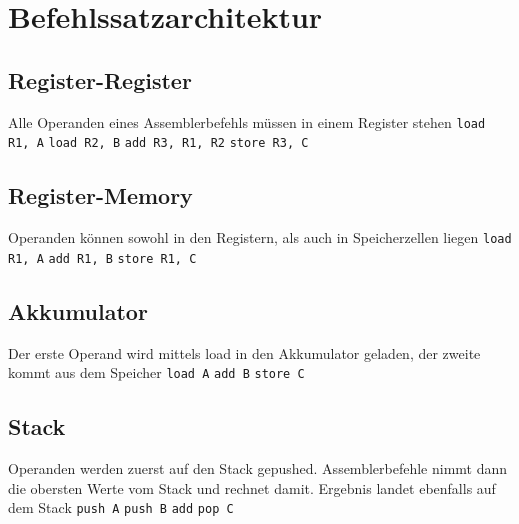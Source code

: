 \section{Befehlssatzarchitektur}
	\subsection{Register-Register}
		Alle Operanden eines Assemblerbefehls müssen in einem Register stehen \newline \newline
		\verb|load R1, A|\newline
		\verb|load R2, B|\newline
		\verb|add R3, R1, R2|\newline
		\verb|store R3, C|
	\subsection{Register-Memory}
		Operanden können sowohl in den Registern, als auch in Speicherzellen liegen
		\newline \newline
		\verb|load R1, A|\newline
		\verb|add R1, B|\newline
		\verb|store R1, C|
	\subsection{Akkumulator}
		Der erste Operand wird mittels load in den Akkumulator geladen, der zweite kommt aus dem Speicher
		\newline \newline
		\verb|load A|\newline
		\verb|add B|\newline
		\verb|store C|
	\subsection{Stack}
		Operanden werden zuerst auf den Stack gepushed. Assemblerbefehle nimmt dann die obersten Werte vom Stack und rechnet damit. Ergebnis landet ebenfalls auf dem Stack
		\newline \newline
		\verb|push A|\newline
		\verb|push B|\newline
		\verb|add|\newline
		\verb|pop C|